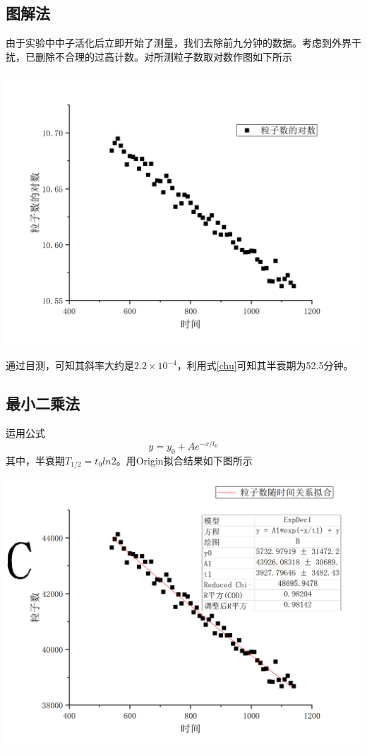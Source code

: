 \documentclass[hyperref]{ctexart}
\begin{document}
\begin{multicols}{2}
	\subsection{图解法}
	由于实验中中子活化后立即开始了测量，我们去除前九分钟的数据。考虑到外界干扰，已删除不合理的过高计数。对所测粒子数取对数作图如下所示
	\begin{center}\includegraphics[scale=0.3]{t2}\end{center}
	
	通过目测，可知其斜率大约是$2.2 \times 10^{-4}$，利用式\eqref{chu}可知其半衰期为52.5分钟。

	\subsection{最小二乘法}
	运用公式
	\begin{equation}
	y=y_0+Ae^{-x/t_0}
	\end{equation}
	其中，半衰期$T_{1/2}=t_0ln2$。用Origin拟合结果如下图所示
	\begin{center}\includegraphics[scale=0.3]{t3}\end{center}


\end{multicols}
\end{document}
